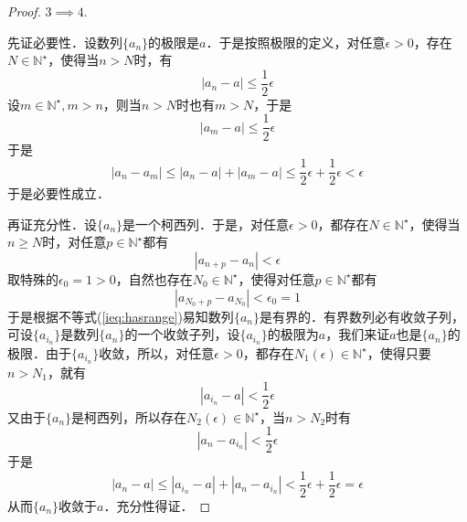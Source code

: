 \documentclass{ctexart}
\theoremstyle{definition}
\theoremstyle{definition}
\theoremstyle{plain}
\theoremstyle{plain}
\theoremstyle{plain}
\theoremstyle{definition}
\newcommand{\nat}{\mathbb{N}^\star}
\begin{document}
\begin{proof}
$3 \implies 4$.

\noindent 先证必要性．设数列$\{a_n\}$的极限是$a$．于是按照极限的定义，对任意$\epsilon >0$，存在$N \in \nat$，使得当$n > N$时，有
\begin{equation}
    |a_n - a| \leq \frac{1}{2} \epsilon
\end{equation}
设$m \in \nat, m > n$，则当$n > N$时也有$m > N$，于是
\begin{equation}
    |a_m - a| \leq \frac{1}{2} \epsilon
\end{equation}
于是
\begin{equation}
    |a_n - a_m| \leq |a_n - a| + |a_m - a| \leq \frac{1}{2} \epsilon + \frac{1}{2} \epsilon < \epsilon
\end{equation}
于是必要性成立．

\noindent 再证充分性．设$\{a_n\}$是一个柯西列．于是，对任意$\epsilon > 0$，都存在$N \in \nat$，使得当$n \geq N$时，对任意$p \in \nat$都有
\begin{equation}
    |a_{n+p} - a_n| < \epsilon
\end{equation}
取特殊的$\epsilon_0 = 1 > 0$，自然也存在$N_0 \in \nat$，使得对任意$p \in \nat$都有
\begin{equation}
    |a_{N_0+p} - a_{N_0}| < \epsilon_0 = 1
    \label{ieq:hasrange}
\end{equation}
于是根据不等式(\ref{ieq:hasrange})易知数列$\{a_n\}$是有界的．有界数列必有收敛子列，可设$\{a_{i_n}\}$是数列$\{a_n\}$的一个收敛子列，设$\{a_{i_n}\}$的极限为$a$，我们来证$a$也是$\{a_n\}$的极限．由于$\{a_{i_n}\}$收敛，所以，对任意$\epsilon > 0$，都存在$N_1(\epsilon) \in \nat$，使得只要$n > N_1$，就有
\begin{equation}
    |a_{i_n}-a|<\frac{1}{2}\epsilon
\end{equation}
又由于$\{a_n\}$是柯西列，所以存在$N_2(\epsilon) \in \nat$，当$n > N_2$时有
\begin{equation}
    |a_{n}-a_{i_n}|<\frac{1}{2}\epsilon
\end{equation}
于是
\begin{equation}
    |a_n - a| \leq |a_{i_n}-a|+|a_n-a_{i_n}| < \frac{1}{2}\epsilon+\frac{1}{2}\epsilon = \epsilon
\end{equation}
从而$\{ a_n \}$收敛于$a$．充分性得证．
\end{proof}
\end{document}
